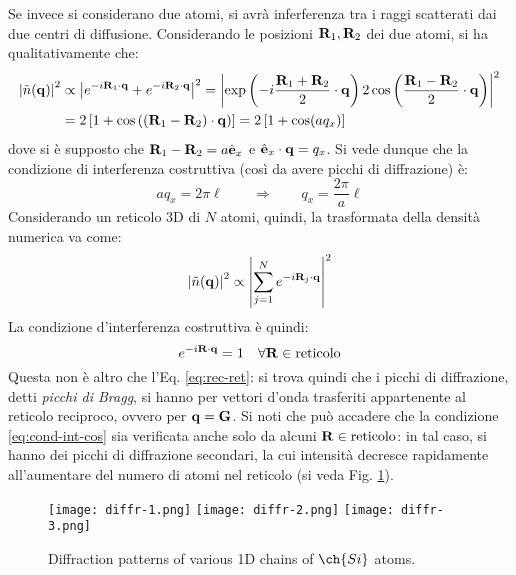 Se invece si considerano due atomi, si avrà inferferenza tra i raggi scatterati dai due centri di diffusione. Considerando le posizioni $ \mathbf{R}_1 , \mathbf{R}_2 $ dei due atomi, si ha qualitativamente che:
\begin{equation*}
	\begin{split}
		\left\lvert\tilde{n}(\mathbf{q})\right\rvert^2
		& \propto \left\lvert e^{-i \mathbf{R}_1 \cdot \mathbf{q}} + e^{-i \mathbf{R}_2 \cdot \mathbf{q}}\right\rvert^2 = \left\lvert\exp \left( -i \frac{\mathbf{R}_1 + \mathbf{R}_2}{2} \cdot \mathbf{q} \right) 2 \cos \left( \frac{\mathbf{R}_1 - \mathbf{R}_2}{2} \cdot \mathbf{q} \right)\right\rvert^2 \\
		& = 2 \left[ 1 + \cos \left( (\mathbf{R}_1 - \mathbf{R}_2) \cdot \mathbf{q} \right) \right] = 2 \left[ 1 + \cos (a q_x) \right]
	\end{split}
\end{equation*}
dove si è supposto che $ \mathbf{R}_1 - \mathbf{R}_2 = a \hat{\mathbf{e}}_x $ e $ \hat{\mathbf{e}}_x \cdot \mathbf{q} = q_x $. Si vede dunque che la condizione di interferenza costruttiva (così da avere picchi di diffrazione) è:
\begin{equation*}
	aq_x = 2\pi \ell
	\qquad \Rightarrow \qquad
	q_x = \frac{2\pi}{a} \ell
\end{equation*}
Considerando un reticolo 3D di $ N $ atomi, quindi, la trasformata della densità numerica va come:
\begin{equation*}
\left\lvert\tilde{n}(\mathbf{q})\right\rvert^2 \propto \left\lvert\sum_{j = 1}^N e^{-i \mathbf{R}_j \cdot \mathbf{q}}\right\rvert^2
\end{equation*}
La condizione d'interferenza costruttiva è quindi:
\begin{equation}
	e^{-i \mathbf{R} \cdot \mathbf{q}} = 1 \quad \forall \mathbf{R} \in \text{reticolo}
	\label{eq:cond-int-cos}
\end{equation}
Questa non è altro che l'Eq. \ref{eq:rec-ret}: si trova quindi che i picchi di diffrazione, detti \textit{picchi di Bragg}, si hanno per vettori d'onda trasferiti appartenente al reticolo reciproco, ovvero per $ \mathbf{q} = \mathbf{G} $. Si noti che può accadere che la condizione \ref{eq:cond-int-cos} sia verificata anche solo da alcuni $ \mathbf{R} \in \text{reticolo} $: in tal caso, si hanno dei picchi di diffrazione secondari, la cui intensità decresce rapidamente all'aumentare del numero di atomi nel reticolo (si veda Fig. \ref{diffr}).

\begin{figure}
	\centering
	\texttt{[image: diffr-1.png]}
	\texttt{[image: diffr-2.png]}
	\texttt{[image: diffr-3.png]}
	\caption{Diffraction patterns of various 1D chains of $ \ch{Si} $ atoms.}
	\label{diffr}
\end{figure}

